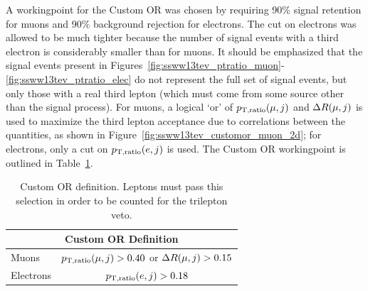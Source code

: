 A workingpoint for the Custom OR was chosen by requiring 90\% signal retention for muons and 90\% background rejection for electrons.
The cut on electrons was allowed to be much tighter because the number of signal events with a third electron is considerably smaller than for muons.
It should be emphasized that the signal events present in Figures~\ref{fig:ssww13tev_ptratio_muon}-\ref{fig:ssww13tev_ptratio_elec} do not represent the full set of signal events, but only those with a real third lepton (which must come from some source other than the signal \ssww process).
For muons, a logical `or' of $p_{\textrm{T},\textrm{ratio}}(\mu,j)$ and $\Delta R(\mu,j)$ is used to maximize the third lepton acceptance due to correlations between the quantities, as shown in Figure~\ref{fig:ssww13tev_customor_muon_2d}; for electrons, only a cut on $p_{\textrm{T},\textrm{ratio}}(e,j)$ is used.
The Custom OR workingpoint is outlined in Table~\ref{tab:custom_or_definition}.

\begin{table}[htbp]
  \centering
  \begin{tabular}{l | c}
    \multicolumn{2}{c}{Custom OR Definition} \\
    \hline\hline
    Muons     & $p_{\textrm{T},\textrm{ratio}}(\mu,j) > 0.40$ or $\Delta R(\mu,j) > 0.15$\\
    Electrons & $p_{\textrm{T},\textrm{ratio}}(e,j) > 0.18$ \\
    \hline
  \end{tabular}
  \caption{Custom OR definition.  Leptons must pass this selection in order to be counted for the trilepton veto.}
  \label{tab:custom_or_definition}
\end{table}

